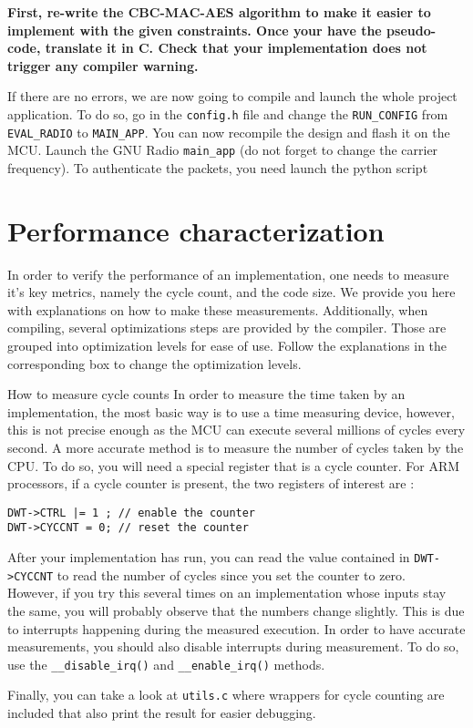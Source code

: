 \textbf{
    First, re-write the CBC-MAC-AES algorithm to make it easier to
    implement with the given constraints. Once your have the pseudo-code, translate it in C. Check that your implementation does not trigger any compiler warning.
}

If there are no errors, we are now going to compile and launch the whole project application. To do so, go in the \texttt{config.h} file and change the \texttt{RUN\_CONFIG} from \texttt{EVAL\_RADIO} to \texttt{MAIN\_APP}. You can now recompile the design and flash it on the MCU. Launch the GNU Radio \texttt{main\_app} (do not forget to change the carrier frequency). To authenticate the packets, you need launch the python script \texttt{}

\section{Performance characterization}
In order to verify the performance of an implementation, one needs to measure it's key metrics, namely the cycle count, and the code size. We provide you here with explanations on how to make these measurements. Additionally, when compiling, several optimizations steps are provided by the compiler. Those are grouped into optimization levels for ease of use. Follow the explanations in the corresponding box to change the optimization levels. 


\begin{bclogo}[couleur = gray!20, arrondi = 0.2, logo=\bcinfo]{How to measure cycle counts} In order to measure the time taken by an implementation, the most basic way is to use a time measuring device, however, this is not precise enough as the MCU can execute several millions of cycles every second. A more accurate method is to measure the number of cycles taken by the CPU. To do so, you will need a special register that is a cycle counter. For ARM processors, if a cycle counter is present, the two registers of interest are :
\begin{lstlisting}[style=customc]
DWT->CTRL |= 1 ; // enable the counter
DWT->CYCCNT = 0; // reset the counter
\end{lstlisting}
After your implementation has run, you can read the value contained in \texttt{DWT->CYCCNT} to read the number of cycles since you set the counter to zero.\\

However, if you try this several times on an implementation whose inputs stay the same, you will probably observe that the numbers change slightly. This is due to interrupts happening during the measured execution. In order to have accurate measurements, you should also disable interrupts during measurement. To do so, use the  \texttt{\_\_disable\_irq()} and \texttt{\_\_enable\_irq()} methods.

Finally, you can take a look at \texttt{utils.c} where wrappers for cycle counting are included that also print the result for easier debugging.
\end{bclogo}



